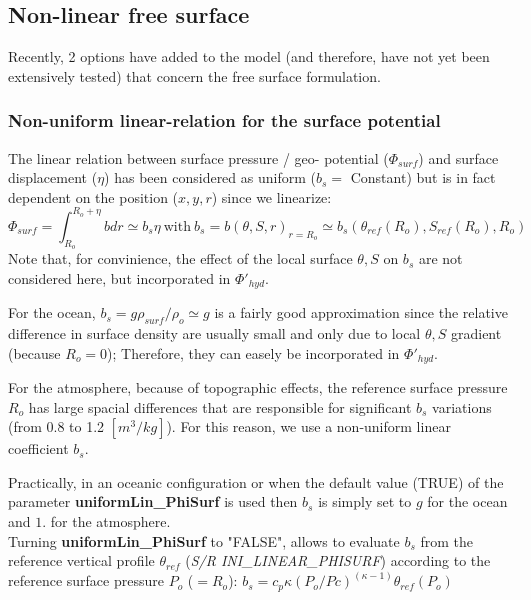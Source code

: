 

\subsection{Non-linear free surface}

Recently, 2 options have added to the model
(and therefore, have not yet been extensively tested)
that concern the free surface formulation.

\subsubsection{Non-uniform linear-relation for the surface potential}

The linear relation between 
surface pressure / geo- potential ($\Phi_{surf}$)
and surface displacement ($\eta$)
has been considered as uniform ($b_s =$ Constant)
but is in fact dependent on the position ($x,y,r$)
since we linearize:
$$\Phi_{surf}=\int_{R_o}^{R_o+\eta} b dr \simeq b_s \eta
~\mathrm{with}~ b_s = b(\theta,S,r)_{r=R_o} 
\simeq b_s(\theta_{ref}(R_o),S_{ref}(R_o),R_o)$$
Note that, for convinience, the effect of the local 
surface $\theta,S$ on $b_s$
are not considered here, but incorporated in $\Phi'_{hyd}$.

For the ocean, $b_s = g \rho_{surf} / \rho_o \simeq g$
is a fairly good approximation since the relative difference
in surface density are usually small and only due to
local $\theta,S$ gradient (because $R_o = 0$);
Therefore, they can easely be incorporated in $\Phi'_{hyd}$.

For the atmosphere, because of topographic effects,
the reference surface pressure $R_o$ has large spacial differences
that are responsible for significant $b_s$ variations
(from 0.8 to 1.2 $[m^3/kg]$). For this reason,
we use a non-uniform linear coefficient $b_s$.

Practically, in an oceanic configuration or
when the default value (TRUE) of the parameter 
{\bf uniformLin\_PhiSurf} is used
then $b_s$ is simply set to $g$ for the ocean
and $1.$ for the atmosphere.\\
Turning {\bf uniformLin\_PhiSurf} to "FALSE", allows to
evaluate $b_s$ from the reference vertical profile $\theta_{ref}$ 
({\it S/R INI\_LINEAR\_PHISURF})
according to the reference surface pressure $P_o$ ($=R_o$):
$b_s = c_p \kappa (P_o / Pc)^{(\kappa - 1)} \theta_{ref}(P_o)$

